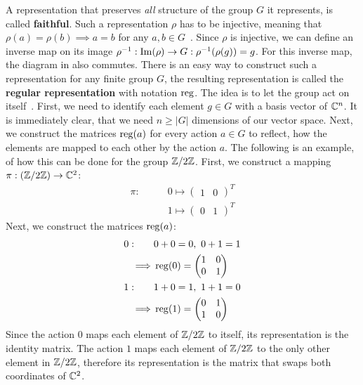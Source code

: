 A representation that preserves \textit{all} structure of the group $G$ it represents, is called \textbf{faithful}.
Such a representation $\rho$ has to be injective, meaning that $\rho(a) = \rho(b) \implies a = b$ for any $a, b \in G$~\cite{hein2013}.
Since $\rho$ is injective, we can define an inverse map on its image $\rho^{-1}: \operatorname{Im}(\rho) \to G: \rho^{-1}(\rho(g)) = g$.
For this inverse map, the diagram in  also commutes.
There is an easy way to construct such a representation for any finite group $G$, the resulting representation is called the \textbf{regular representation} with notation $\operatorname{reg}$.
The idea is to let the group act on itself~\cite{fulton2013}.
First, we need to identify each element $g \in G$ with a basis vector of $\mathbb{C}^n$.
It is immediately clear, that we need $n \geq |G|$ dimensions of our vector space.
Next, we construct the matrices $\operatorname{reg}(a)$ for every action $a \in G$ to reflect, how the elements are mapped to each other by the action $a$.
The following is an example, of how this can be done for the group $\mathbb{Z}/2\mathbb{Z}$.
First, we construct a mapping $\pi: (\mathbb{Z}/2\mathbb{Z}) \to \mathbb{C}^2$:
\begin{align*}
    \pi: \qquad & 0 \mapsto \begin{pmatrix}
        1 & 0
    \end{pmatrix}^T \\
    & 1 \mapsto \begin{pmatrix}
        0 & 1
    \end{pmatrix}^T
\end{align*}
Next, we construct the matrices $\operatorname{reg}(a)$:
\begin{align*}
    0: \qquad & 0 + 0 = 0,\ 0 + 1 = 1 \\
    \implies & \operatorname{reg}(0) = \begin{pmatrix}
        1 & 0 \\
        0 & 1
    \end{pmatrix} \\
    1: \qquad & 1 + 0 = 1,\ 1 + 1 = 0 \\
    \implies & \operatorname{reg}(1) = \begin{pmatrix}
        0 & 1 \\
        1 & 0
    \end{pmatrix}
\end{align*}
Since the action $0$ maps each element of $\mathbb{Z}/2\mathbb{Z}$ to itself, its representation is the identity matrix.
The action $1$ maps each element of $\mathbb{Z}/2\mathbb{Z}$ to the only other element in $\mathbb{Z}/2\mathbb{Z}$, therefore its representation is the matrix that swaps both coordinates of $\mathbb{C}^2$.


